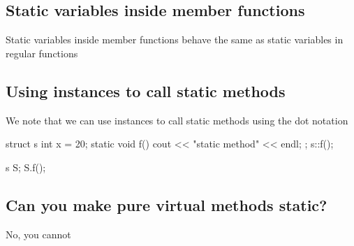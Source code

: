 \documentclass{report}
\begin{document}
    \pagebreak 
    \bigbreak \noindent 
    \subsection{Static variables inside member functions}
    \bigbreak \noindent 
    Static variables inside member functions behave the same as static variables in regular functions
    \bigbreak \noindent 
    \subsection{Using instances to call static methods}
    \bigbreak \noindent 
    We note that we can use instances to call static methods using the dot notation
    \bigbreak \noindent 
    \begin{cppcode}
        struct s{
            int x = 20;
            static void f() {
                cout << "static method" << endl;
            }
        };
        s::f();

        s S;
        S.f();
    \end{cppcode}
    \bigbreak \noindent 
    \subsection{Can you make pure virtual methods static?}
    \bigbreak \noindent 
    No, you cannot
\end{document}
